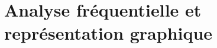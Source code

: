 \pagestyle{empty}
\chapter[Analyse fréquentielle]
        {Analyse fréquentielle et représentation graphique\label{chap-repfreq}}
\minitoc
\newpage
